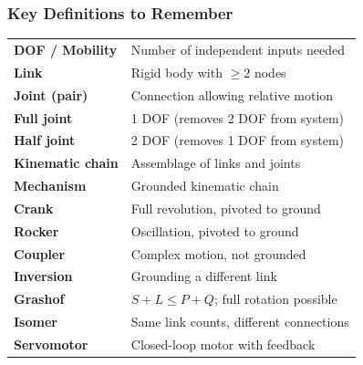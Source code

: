 \documentclass[10pt,aspectratio=43]{beamer}
\begin{document}
\begin{frame}
\frametitle{Key Definitions to Remember}

\begin{yellowbox}
\small
\begin{tabular}{@{}p{3cm}p{7.5cm}@{}}
\textbf{DOF / Mobility} & Number of independent inputs needed \\
\textbf{Link} & Rigid body with $\geq 2$ nodes \\
\textbf{Joint (pair)} & Connection allowing relative motion \\
\textbf{Full joint} & 1 DOF (removes 2 DOF from system) \\
\textbf{Half joint} & 2 DOF (removes 1 DOF from system) \\
\textbf{Kinematic chain} & Assemblage of links and joints \\
\textbf{Mechanism} & Grounded kinematic chain \\
\textbf{Crank} & Full revolution, pivoted to ground \\
\textbf{Rocker} & Oscillation, pivoted to ground \\
\textbf{Coupler} & Complex motion, not grounded \\
\textbf{Inversion} & Grounding a different link \\
\textbf{Grashof} & $S + L \leq P + Q$; full rotation possible \\
\textbf{Isomer} & Same link counts, different connections \\
\textbf{Servomotor} & Closed-loop motor with feedback \\
\end{tabular}
\end{yellowbox}
\end{frame}
\end{document}
